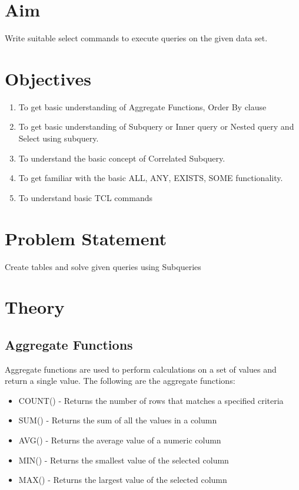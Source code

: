 \documentclass[11pt]{article}
\begin{document}
\tableofcontents
\thispagestyle{empty}
\clearpage

\setcounter{page}{1}

\section{Aim}
Write suitable select commands to execute queries on the given data set.

\section{Objectives}
\begin{enumerate}
    \item To get basic understanding of Aggregate Functions, Order By clause
    \item To get basic understanding of Subquery or Inner query or Nested query and Select using subquery.
    \item To understand the basic concept of Correlated Subquery.
    \item To get familiar with the basic ALL, ANY, EXISTS, SOME functionality.
    \item To understand basic TCL commands
\end{enumerate}


\section{Problem Statement}
Create tables and solve given queries using Subqueries

\section{Theory}

\subsection{Aggregate Functions}

Aggregate functions are used to perform calculations on a set of values and return a single value. The following are the aggregate functions:

\begin{itemize}
    \item COUNT() - Returns the number of rows that matches a specified criteria
    \item SUM() - Returns the sum of all the values in a column
    \item AVG() - Returns the average value of a numeric column
    \item MIN() - Returns the smallest value of the selected column
    \item MAX() - Returns the largest value of the selected column
    
\end{itemize}
\end{document}

